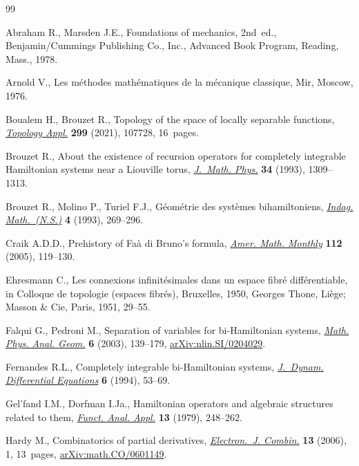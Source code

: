 \begin{thebibliography}{99}
\footnotesize\itemsep=0pt

Abraham R., Marsden J.E., Foundations of mechanics, 2nd~ed., Benjamin/Cummings
 Publishing Co., Inc., Advanced Book Program, Reading, Mass., 1978.

Arnold V., Les m\'ethodes math\'ematiques de la m\'ecanique classique, Mir,
 Moscow, 1976.

Boualem H., Brouzet R., Topology of the space of locally separable functions,
 \href{https://doi.org/10.1016/j.topol.2021.107728}{\textit{Topology Appl.}} \textbf{299} (2021), 107728, 16~pages.

Brouzet R., About the existence of recursion operators for completely
 integrable {H}amiltonian systems near a {L}iouville torus, \href{https://doi.org/10.1063/1.530212}{\textit{J.~Math.
 Phys.}} \textbf{34} (1993), 1309--1313.

Brouzet R., Molino P., Turiel F.J., G\'eom\'etrie des syst\`emes
 bihamiltoniens, \href{https://doi.org/10.1016/0019-3577(93)90002-G}{\textit{Indag. Math.~(N.S.)}} \textbf{4} (1993), 269--296.

Craik A.D.D., Prehistory of {F}a\`a di {B}runo's formula, \href{https://doi.org/10.2307/30037410}{\textit{Amer. Math.
 Monthly}} \textbf{112} (2005), 119--130.

Ehresmann C., Les connexions infinit\'esimales dans un espace fibr\'e
 diff\'erentiable, in Colloque de topologie (espaces fibr\'es), {B}ruxelles,
 1950, Georges Thone, Li\`ege; Masson \& Cie, Paris, 1951, 29--55.

Falqui G., Pedroni M., Separation of variables for bi-{H}amiltonian systems,
 \href{https://doi.org/10.1023/A:1024080315471}{\textit{Math. Phys. Anal. Geom.}} \textbf{6} (2003), 139--179,
 \href{https://arxiv.org/abs/nlin.SI/0204029}{arXiv:nlin.SI/0204029}.

Fernandes R.L., Completely integrable bi-{H}amiltonian systems,
 \href{https://doi.org/10.1007/BF02219188}{\textit{J.~Dynam. Differential Equations}} \textbf{6} (1994), 53--69.

Gel'fand I.M., Dorfman I.Ja., Hamiltonian operators and algebraic structures
 related to them, \href{https://doi.org/10.1007/BF01078363}{\textit{Funct. Anal. Appl.}} \textbf{13} (1979), 248--262.

Hardy M., Combinatorics of partial derivatives, \href{https://doi.org/10.37236/1027}{\textit{Electron.~J. Combin.}}
 \textbf{13} (2006), 1, 13~pages, \href{https://arxiv.org/abs/math.CO/0601149}{arXiv:math.CO/0601149}.


\end{thebibliography}

